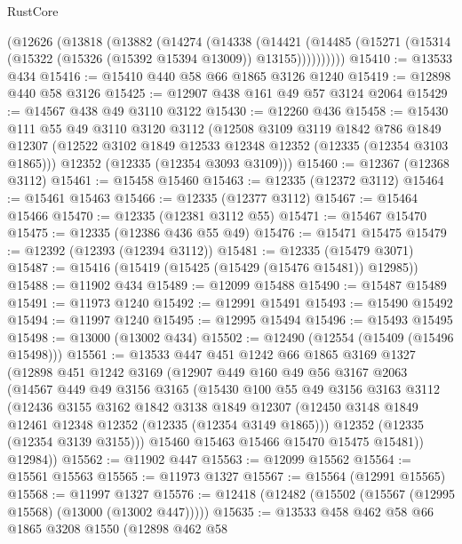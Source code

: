 \begin{lexlean}{RustCore}
\begin{coremodule}
    (@12626
      (@13818
        (@13882
          (@14274
            (@14338
              (@14421
                (@14485 (@15271 (@15314 (@15322 (@15326 (@15392 @15394 @13009)) @13155))))))))))
@15410 := @13533 @434
@15416 := @15410 @440 @58 @66 @1865 @3126 @1240
@15419 := @12898 @440 @58 @3126
@15425 := @12907 @438 @161 @49 @57 @3124 @2064
@15429 := @14567 @438 @49 @3110 @3122
@15430 := @12260 @436
@15458 := @15430
    @111
    @55
    @49
    @3110
    @3120
    @3112
    (@12508
      @3109
      @3119
      @1842
      @786
      @1849
      @12307
      (@12522 @3102 @1849 @12533 @12348 @12352 (@12335 (@12354 @3103 @1865)))
      @12352
      (@12335 (@12354 @3093 @3109)))
@15460 := @12367 (@12368 @3112)
@15461 := @15458 @15460
@15463 := @12335 (@12372 @3112)
@15464 := @15461 @15463
@15466 := @12335 (@12377 @3112)
@15467 := @15464 @15466
@15470 := @12335 (@12381 @3112 @55)
@15471 := @15467 @15470
@15475 := @12335 (@12386 @436 @55 @49)
@15476 := @15471 @15475
@15479 := @12392 (@12393 (@12394 @3112))
@15481 := @12335 (@15479 @3071)
@15487 := @15416 (@15419 (@15425 (@15429 (@15476 @15481)) @12985))
@15488 := @11902 @434
@15489 := @12099 @15488
@15490 := @15487 @15489
@15491 := @11973 @1240
@15492 := @12991 @15491
@15493 := @15490 @15492
@15494 := @11997 @1240
@15495 := @12995 @15494
@15496 := @15493 @15495
@15498 := @13000 (@13002 @434)
@15502 := @12490 (@12554 (@15409 (@15496 @15498)))
@15561 := @13533
    @447
    @451
    @1242
    @66
    @1865
    @3169
    @1327
    (@12898
      @451
      @1242
      @3169
      (@12907
        @449
        @160
        @49
        @56
        @3167
        @2063
        (@14567
          @449
          @49
          @3156
          @3165
          (@15430
            @100
            @55
            @49
            @3156
            @3163
            @3112
            (@12436
              @3155
              @3162
              @1842
              @3138
              @1849
              @12307
              (@12450 @3148 @1849 @12461 @12348 @12352 (@12335 (@12354 @3149 @1865)))
              @12352
              (@12335 (@12354 @3139 @3155)))
            @15460
            @15463
            @15466
            @15470
            @15475
            @15481))
        @12984))
@15562 := @11902 @447
@15563 := @12099 @15562
@15564 := @15561 @15563
@15565 := @11973 @1327
@15567 := @15564 (@12991 @15565)
@15568 := @11997 @1327
@15576 := @12418 (@12482 (@15502 (@15567 (@12995 @15568) (@13000 (@13002 @447)))))
@15635 := @13533
    @458
    @462
    @58
    @66
    @1865
    @3208
    @1550
    (@12898
      @462
      @58

\end{coremodule}
\end{lexlean}
